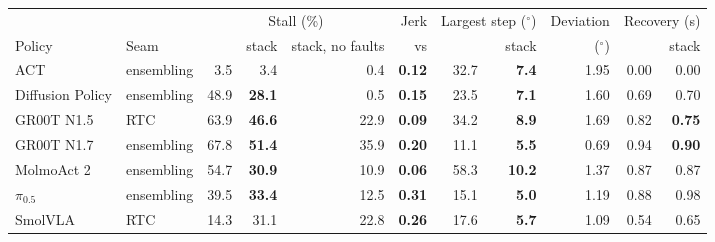 \begin{tabular}{l l rrr r rr r rr}
\toprule
 & & \multicolumn{3}{c}{Stall (\%)} & Jerk & \multicolumn{2}{c}{Largest step ($^\circ$)} & Deviation & \multicolumn{2}{c}{Recovery (s)} \\
\cmidrule(lr){3-5}\cmidrule(lr){7-8}\cmidrule(lr){10-11}
Policy & Seam & \drtc{} & stack & stack, no faults & vs \drtc{} & \drtc{} & stack & ($^\circ$) & \drtc{} & stack \\
\midrule
ACT & ensembling & 3.5 & 3.4 & 0.4 & \textbf{0.12} & 32.7 & \textbf{7.4} & 1.95 & 0.00 & 0.00 \\
Diffusion Policy & ensembling & 48.9 & \textbf{28.1} & 0.5 & \textbf{0.15} & 23.5 & \textbf{7.1} & 1.60 & 0.69 & 0.70 \\
GR00T N1.5 & RTC & 63.9 & \textbf{46.6} & 22.9 & \textbf{0.09} & 34.2 & \textbf{8.9} & 1.69 & 0.82 & \textbf{0.75} \\
GR00T N1.7 & ensembling & 67.8 & \textbf{51.4} & 35.9 & \textbf{0.20} & 11.1 & \textbf{5.5} & 0.69 & 0.94 & \textbf{0.90} \\
MolmoAct 2 & ensembling & 54.7 & \textbf{30.9} & 10.9 & \textbf{0.06} & 58.3 & \textbf{10.2} & 1.37 & 0.87 & 0.87 \\
$\pi_{0.5}$ & ensembling & 39.5 & \textbf{33.4} & 12.5 & \textbf{0.31} & 15.1 & \textbf{5.0} & 1.19 & 0.88 & 0.98 \\
SmolVLA & RTC & 14.3 & 31.1 & 22.8 & \textbf{0.26} & 17.6 & \textbf{5.7} & 1.09 & 0.54 & 0.65 \\
\bottomrule
\end{tabular}
